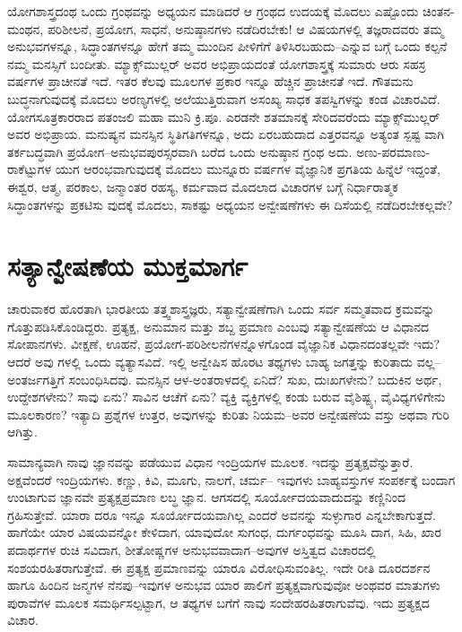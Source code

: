 ಯೋಗಶಾಸ್ತ್ರದಂಥ ಒಂದು ಗ್ರಂಥವನ್ನು ಅಧ್ಯಯನ ಮಾಡಿದರೆ ಆ ಗ್ರಂಥದ ಉದಯಕ್ಕೆ ಮೊದಲು ಎಷ್ಟೊಂದು ಚಿಂತನ-ಮಂಥನ, ಪರಿಶೀಲನೆ, ಪ್ರಯೋಗ, ಸಾಧನೆ, ಅನುಷ್ಠಾನಗಳು ನಡೆದಿರಬೇಕು! ಆ ವಿಷಯಗಳಲ್ಲಿ ತಜ್ಞರಾದವರು ತಮ್ಮ ಅನುಭವಗಳನ್ನೂ, ಸಿದ್ಧಾಂತಗಳನ್ನೂ ಹೇಗೆ ತಮ್ಮ ಮುಂದಿನ ಪೀಳಿಗೆಗೆ ತಿಳಿಸಿರಬಹುದು–ಎನ್ನುವ ಬಗ್ಗೆ ಒಂದು ಕಲ್ಪನೆ ನಮ್ಮ ಮನಸ್ಸಿಗೆ ಬಂದೀತು. ಮ್ಯಾಕ್ಸ್​ಮುಲ್ಲರ್ ಅವರ ಅಭಿಪ್ರಾಯದಂತೆ ಯೋಗಶಾಸ್ತ್ರಕ್ಕೆ ಸುಮಾರು ಆರು ಸಹಸ್ರ ವರ್ಷಗಳ ಪ್ರಾಚೀನತೆ ಇದೆ. ಇತರ ಕೆಲವು ಮೂಲಗಳ ಪ್ರಕಾರ ಇನ್ನೂ ಹೆಚ್ಚಿನ ಪ್ರಾಚೀನತೆ ಇದೆ. ಗೌತಮನು ಬುದ್ಧನಾಗುವುದಕ್ಕೆ ಮೊದಲು ಅರಣ್ಯಗಳಲ್ಲಿ ಅಲೆಯುತ್ತಿರುವಾಗ ಅಸಂಖ್ಯ ಸಾಧಕ ತಪಸ್ವಿಗಳನ್ನು ಕಂಡ ವಿಚಾರವಿದೆ. ಯೋಗಸೂತ್ರಕಾರರಾದ ಪತಂಜಲಿ ಮಹಾ ಮುನಿ ಕ್ರಿ.ಪೂ. ಎರಡನೇ ಶತಮಾನಕ್ಕೆ ಸೇರಿದವರೆಂದು ಮ್ಯಾಕ್ಸ್​ಮುಲ್ಲರ್ ಅವರ ಅಭಿಪ್ರಾಯ. ಮನುಷ್ಯನ ಮನಸ್ಸಿನ ಸ್ಥಿತಿಗತಿಗಳನ್ನೂ, ಅದು ಏರಬಹುದಾದ ಎತ್ತರವನ್ನೂ ಅತ್ಯಂತ ಸ್ಪಷ್ಟ ವಾಗಿ ತರ್ಕಬದ್ಧವಾಗಿ ಪ್ರಯೋಗ–ಅನುಭವಪುರಸ್ಸರವಾಗಿ ಬರೆದ ಒಂದು ಅನುಷ್ಠಾನ ಗ್ರಂಥ ಅದು. ಅಣು-ಪರಮಾಣು-ರಾಕೆಟ್ಟುಗಳ ಯುಗ ಆರಂಭವಾಗುವುದಕ್ಕೆ ಮೊದಲು ಮುನ್ನೂರು ವರ್ಷಗಳ ವೈಜ್ಞಾನಿಕ ಪ್ರಗತಿಯ ಹಿನ್ನೆಲೆ ಇದ್ದಂತೆ, ಈಶ್ವರ, ಆತ್ಮ, ಪರಕಾಲ, ಜನ್ಮಾಂತರ ರಹಸ್ಯ, ಕರ್ಮವಾದ ಮೊದಲಾದ ವಿಚಾರಗಳ ಬಗ್ಗೆ ನಿರ್ಧಾರಾತ್ಮಕ ಸಿದ್ಧಾಂತಗಳನ್ನು ಪ್ರಕಟಿಸು ವುದಕ್ಕೆ ಮೊದಲು, ಸಾಕಷ್ಟು ಅಧ್ಯಯನ ಅನ್ವೇಷಣೆಗಳು ಈ ದಿಸೆಯಲ್ಲಿ ನಡೆದಿರಬೇಕಲ್ಲವೇ?


\section{ಸತ್ಯಾನ್ವೇಷಣೆಯ ಮುಕ್ತಮಾರ್ಗ}

ಚಾರುವಾಕರ ಹೊರತಾಗಿ ಭಾರತೀಯ ತತ್ತ್ವಶಾಸ್ತ್ರಜ್ಞರು, ಸತ್ಯಾನ್ವೇಷಣೆಗಾಗಿ ಒಂದು ಸರ್ವ ಸಮ್ಮತವಾದ ಕ್ರಮವನ್ನು ಗೊತ್ತುಪಡಿಸಿಕೊಂಡಿದ್ದರು. ಪ್ರತ್ಯಕ್ಷ, ಅನುಮಾನ ಮತ್ತು ಶಬ್ದ ಪ್ರಮಾಣ ಎಂಬವು ಸತ್ಯಾನ್ವೇಷಣೆಯ ಆ ವಿಧಾನದ ಸೋಪಾನಗಳು. ವೀಕ್ಷಣೆ, ಊಹನೆ, ಪ್ರಯೋಗ-ಪರಿಶೀಲನೆಗಳನ್ನೊಳಗೊಂಡ ವೈಜ್ಞಾನಿಕ ವಿಧಾನದಂತಲ್ಲವೇ ಇದು? ಆದರೆ ಅವು ಗಳಲ್ಲಿ ಒಂದು ವ್ಯತ್ಯಾಸವಿದೆ. ಇಲ್ಲಿ ಅನ್ವೇಷಿಸ ಹೊರಟ ತಥ್ಯಗಳು ಬಾಹ್ಯ ಜಗತ್ತನ್ನು ಕುರಿತಾದು ವಲ್ಲ–ಅಂತರ್ಜಗತ್ತಿಗೆ ಸಂಬಂಧಿಸಿದವು. ಮನಸ್ಸಿನ ಆಳ-ಅಂತರಾಳದಲ್ಲಿ ಏನಿದೆ? ಸುಖ, ದುಃಖಗಳೇನು? ಬದುಕಿನ ಅರ್ಥ, ಉದ್ದೇಶಗಳೇನು? ಸಾವು ಏನು? ಸಾವಿನ ಆಚೆಗೆ ಏನು? ವ್ಯಕ್ತಿ ವ್ಯಕ್ತಿಗಳಲ್ಲಿ ಕಂಡು ಬರುವ ವೈಶಿಷ್ಟ್ಯ, ವೈವಿಧ್ಯಗಳಿಗೇನು ಮೂಲಕಾರಣ? ಇತ್ಯಾದಿ ಪ್ರಶ್ನೆಗಳ ಉತ್ತರ, ಅವುಗಳನ್ನು ಕುರಿತು ನಿಯಮ–ಅವರ ಅನ್ವೇಷಣೆಯ ವಸ್ತು ಅಥವಾ ಗುರಿ ಆಗಿತ್ತು.

ಸಾಮಾನ್ಯವಾಗಿ ನಾವು ಜ್ಞಾನವನ್ನು ಪಡೆಯುವ ವಿಧಾನ ಇಂದ್ರಿಯಗಳ ಮೂಲಕ. ಇದನ್ನು ಪ್ರತ್ಯಕ್ಷವೆನ್ನುತ್ತಾರೆ. ಅಕ್ಷವೆಂದರೆ ಇಂದ್ರಿಯಗಳು. ಕಣ್ಣು, ಕಿವಿ, ಮೂಗು, ನಾಲಗೆ, ಚರ್ಮ– ಇವುಗಳು ಬಾಹ್ಯವಸ್ತುಗಳ ಸಂಪರ್ಕಕ್ಕೆ ಬಂದಾಗ ಉಂಟಾಗುವ ಜ್ಞಾನವೇ ಪ್ರತ್ಯಕ್ಷಪ್ರಮಾಣ ಲಬ್ಧ ಜ್ಞಾನ. ಆಗಸದಲ್ಲಿ ಸೂರ್ಯೋದಯವಾದುದನ್ನು ಕಣ್ಣಿನಿಂದ ಗ್ರಹಿಸುತ್ತೇವೆ. ಯಾರಾ ದರೂ ಇನ್ನೂ ಸೂರ್ಯೋದಯವಾಗಿಲ್ಲ ಎಂದರೆ ಅವನನ್ನು ಸುಳ್ಳುಗಾರ ಎನ್ನಬೇಕಾಗುತ್ತದೆ. ಹಾಗೆಯೇ ಯಾರ ವಿಷಯವನ್ನೋ ಕೇಳಿದಾಗ, ಯಾವುದೋ ಸುಗಂಧ, ದುರ್ಗಂಧವನ್ನು ಮೂಸಿ ದಾಗ, ಸಿಹಿ, ಖಾರ ಪದಾರ್ಥಗಳ ರುಚಿ ಸವಿದಾಗ, ಶೀತೋಷ್ಣಗಳ ಅನುಭವವಾದಾಗ–ಅವುಗಳ ಅಸ್ತಿತ್ವದ ವಿಚಾರದಲ್ಲಿ ಸಂಶಯರಹಿತರಾಗುತ್ತೇವೆ. ಈ ಪ್ರತ್ಯಕ್ಷ ಪ್ರಮಾಣವನ್ನು ಯಾರೂ ವಿರೋಧಿಸುವಂತಿಲ್ಲ. ಇದೇ ರೀತಿ ದೂರದರ್ಶನ ಹಾಗೂ ಹಿಂದಿನ ಜನ್ಮಗಳ ನೆನಪು–ಇವುಗಳ ಅನುಭವ ಯಾರ ಪಾಲಿಗೆ ಪ್ರತ್ಯಕ್ಷವಾಗುವುವೋ ಅಂಥವರ ಮಾತುಗಳು ಪುರಾವೆಗಳ ಮೂಲಕ ಸಮರ್ಥಿಸಲ್ಪಟ್ಟಾಗ, ಆ ತಥ್ಯಗಳ ಬಗೆಗೆ ನಾವು ಸಂದೇಹರಹಿತರಾಗುವೆವು. ಇದು ಪ್ರತ್ಯಕ್ಷದ ವಿಚಾರ.

